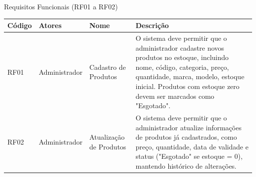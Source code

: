 \documentclass[
	12pt,				%
	openany,			%
	twoside,			%
	a4paper,			%
	english,			%
	brazil				%
	]{abntex2}
\begin{document}
\begin{quadro}[htb]
\caption{\label{quadro_rf1}Requisitos Funcionais (RF01 a RF02)}
\hspace*{-1cm}
\begin{tabular}{|p{1.4cm}|p{2.8cm}|p{4.5cm}|p{7.0cm}|}
    \hline
    \textbf{Código} & \textbf{Atores} & \textbf{Nome} & \textbf{Descrição} \\ \hline

    RF01 & Administrador & Cadastro de Produtos & O sistema deve permitir que o administrador cadastre novos produtos no estoque, incluindo nome, código, categoria, preço, quantidade, marca, modelo, estoque inicial. Produtos com estoque zero devem ser marcados como "Esgotado". \\ \hline

    RF02 & Administrador & Atualização de Produtos & O sistema deve permitir que o administrador atualize informações de produtos já cadastrados, como preço, quantidade, data de validade e status ("Esgotado" se estoque = 0), mantendo histórico de alterações. \\ \hline

   

   

    


\end{tabular}
\end{quadro}
\end{document}
